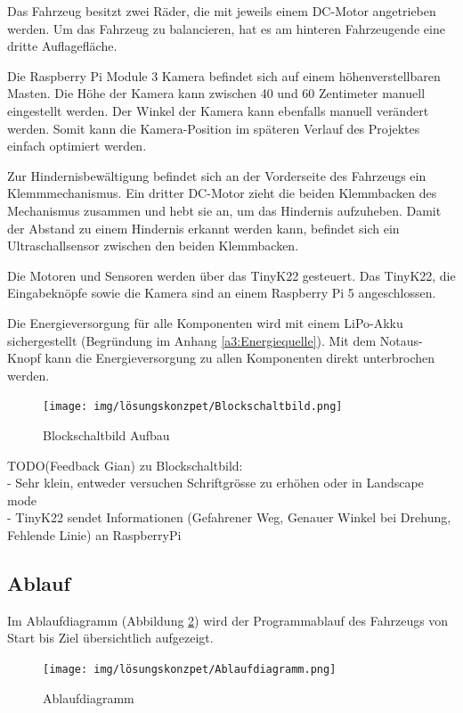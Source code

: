 \documentclass[../main.tex]{subfiles}
\begin{document}
Das Fahrzeug besitzt zwei Räder, die mit jeweils einem DC-Motor angetrieben werden. Um das Fahrzeug zu balancieren, hat es am hinteren Fahrzeugende eine dritte Auflagefläche.

Die Raspberry Pi Module 3 Kamera befindet sich auf einem höhenverstellbaren Masten. Die Höhe der Kamera kann zwischen 40 und 60 Zentimeter manuell eingestellt werden. Der Winkel der Kamera kann ebenfalls manuell verändert werden. Somit kann die Kamera-Position im späteren Verlauf des Projektes einfach optimiert werden.

Zur Hindernisbewältigung befindet sich an der Vorderseite des Fahrzeugs ein Klemmmechanismus. Ein dritter DC-Motor zieht die beiden Klemmbacken des Mechanismus zusammen und hebt sie an, um das Hindernis aufzuheben. Damit der Abstand zu einem Hindernis erkannt werden kann, befindet sich ein Ultraschallsensor zwischen den beiden Klemmbacken. 

Die Motoren und Sensoren werden über das TinyK22 gesteuert.
Das TinyK22, die Eingabeknöpfe sowie die Kamera sind an einem Raspberry Pi 5 angeschlossen.

Die Energieversorgung für alle Komponenten wird mit einem LiPo-Akku sichergestellt (Begründung im Anhang \ref{a3:Energiequelle}).
Mit dem Notaus-Knopf kann die Energieversorgung zu allen Komponenten direkt unterbrochen werden.
\newline
\newline
\begin{figure}[H]
\centering
\texttt{[image: img/lösungskonzpet/Blockschaltbild.png]}
\caption{Blockschaltbild Aufbau}
\label{img:Blockschaltbild-Aufbau}
\end{figure}

{\color{red} TODO(Feedback Gian) zu Blockschaltbild:} \\
- Sehr klein, entweder versuchen Schriftgrösse zu erhöhen oder in Landscape mode \\
- TinyK22 sendet Informationen (Gefahrener Weg, Genauer Winkel bei Drehung, Fehlende Linie) an RaspberryPi \\

\newpage
\subsection{Ablauf}

Im Ablaufdiagramm (Abbildung \ref{img:ablaufdiagramm}) wird der Programmablauf des Fahrzeugs von Start bis Ziel übersichtlich aufgezeigt.

\begin{figure}[H]
\texttt{[image: img/lösungskonzpet/Ablaufdiagramm.png]}
\caption{Ablaufdiagramm}
\label{img:ablaufdiagramm}
\end{figure}
\end{document}
